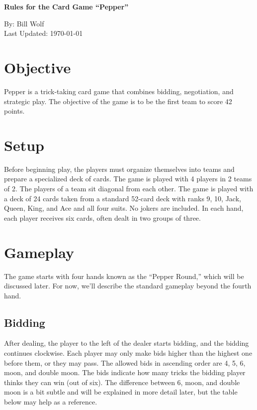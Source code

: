 \documentclass[11pt]{article}
\begin{document}
\begin{center}
  \begin{Large}
\textbf{Rules for the Card Game
``Pepper''}\\
  \end{Large}
  By: Bill Wolf\\
  Last Updated: \today
\end{center}

\section{Objective}\label{objective}

Pepper is a trick-taking card game that combines bidding, negotiation,
and strategic play. The objective of the game is to be the first team to
score 42 points.

\section{Setup}\label{setup}

Before beginning play, the players must organize themselves into teams
and prepare a specialized deck of cards. The game is played with 4
players in 2 teams of 2. The players of a team sit diagonal from each other. The
game is played with a deck of 24 cards taken from a standard 52-card
deck with ranks 9, 10, Jack, Queen, King, and Ace and all four suits. No
jokers are included. In each hand, each player receives six cards, often
dealt in two groups of three.

\section{Gameplay}\label{gameplay}

The game starts with four hands known as the ``Pepper Round,'' which
will be discussed later. For now, we'll describe the standard gameplay
beyond the fourth hand.

\subsection{Bidding}\label{bidding}

After dealing, the player to the left of the dealer starts bidding, and
the bidding continues clockwise. Each player may only make bids higher
than the highest one before them, or they may pass. The allowed bids in
ascending order are 4, 5, 6, moon, and double moon. The bids indicate
how many tricks the bidding player thinks they can win (out of six). The
difference between 6, moon, and double moon is a bit subtle and will be
explained in more detail later, but the table below may help as a
reference.
\end{document}
